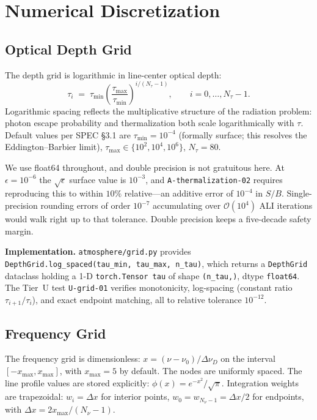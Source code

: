 \documentclass[11pt]{article}
\newcommand{\code}[1]{\texttt{#1}}
\begin{document}
\section{Numerical Discretization}
\label{sec:discretization}

\subsection{Optical Depth Grid}
\label{sec:depth-grid}

The depth grid is logarithmic in line-center optical depth:
\begin{equation}
\tau_i \;=\; \tau_{\min}\!\left(\frac{\tau_{\max}}{\tau_{\min}}\right)^{i/(N_\tau-1)},
\qquad i = 0, \ldots, N_\tau - 1.
\end{equation}
Logarithmic spacing reflects the multiplicative structure of the
radiation problem: photon escape probability and thermalization both
scale logarithmically with $\tau$.  Default values per SPEC §3.1 are
$\tau_{\min} = 10^{-4}$ (formally surface; this resolves the
Eddington--Barbier limit), $\tau_{\max} \in \{10^2, 10^4, 10^6\}$,
$N_\tau = 80$.

We use float64 throughout, and double precision is not gratuitous
here.  At $\epsilon = 10^{-6}$ the $\sqrt{\epsilon}$ surface value is
$10^{-3}$, and \texttt{A-thermalization-02} requires reproducing this
to within $10\%$ relative---an additive error of $10^{-4}$ in $S/B$.
Single-precision rounding errors of order $10^{-7}$ accumulating over
$\mathcal{O}(10^4)$ ALI iterations would walk right up to that
tolerance.  Double precision keeps a five-decade safety margin.

\textbf{Implementation.} \code{atmosphere/grid.py} provides
\code{DepthGrid.log\_spaced(tau\_min, tau\_max, n\_tau)}, which returns a
\code{DepthGrid} dataclass holding a 1-D \code{torch.Tensor tau} of shape
\code{(n\_tau,)}, dtype \code{float64}. The Tier~U test
\texttt{U-grid-01} verifies monotonicity, log-spacing (constant ratio
$\tau_{i+1}/\tau_i$), and exact endpoint matching, all to relative
tolerance $10^{-12}$.

\subsection{Frequency Grid}
\label{sec:freq-grid}

The frequency grid is dimensionless: $x = (\nu - \nu_0)/\Delta\nu_D$ on
the interval $[-x_{\max}, x_{\max}]$, with $x_{\max} = 5$ by default. The
nodes are uniformly spaced. The line profile values are stored explicitly:
$\phi(x) = e^{-x^2}/\sqrt{\pi}$. Integration weights are trapezoidal:
$w_i = \Delta x$ for interior points, $w_0 = w_{N_\nu - 1} = \Delta x / 2$
for endpoints, with $\Delta x = 2 x_{\max}/(N_\nu - 1)$.
\end{document}
